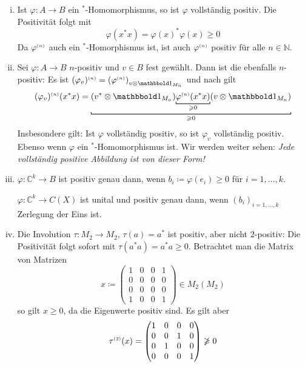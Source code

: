 \begin{beispiel}[label=bsp:35,{name=[{n-positive und vollständig positive Abbildungen}]}]
	\leavevmode
	\begin{enumerate}[(i)]
		\item Ist $\varphi \colon A \to B$ ein $^*$-Homomorphismus, so ist $\varphi$ vollständig positiv.
		Die Positivität folgt mit
		\[
			\varphi(x^*x) = \varphi(x)^* \varphi(x) \ge 0
		\]
		Da $\varphi^{\scriptscriptstyle(n)}$ auch ein $^*$-Homorphismus ist, ist auch $\varphi^{\scriptscriptstyle(n)}$ positiv für alle $n \in \mathbb{N}$.
		\item Sei $\varphi \colon A \to B$ $n$-positiv und $v \in B$ fest gewählt.
		Dann ist die 
		ebenfalls $n$-positiv:
		Es ist $(\varphi_v)^\ssbrace{n} = \enbrace*{\varphi^\ssbrace{n}}_{v \otimes \ind_{M_n}}$ und nach \cite[Satz~3.7 (v)]{OpAlg} gilt
		\[
			(\varphi_v)^\ssbrace{n}(x^* x) = \Underbracket{\enbrace*{v^* \otimes \ind_{M_n}} \Underbracket{\varphi^\ssbrace{n}(x^*x)}{\ge 0} \enbrace*{v \otimes \ind_{M_n}}}{\ge 0}
		\]
		Insbesondere gilt: Ist $\varphi$ vollständig positiv, so ist $\varphi_v$ vollständig positiv. Ebenso wenn $\varphi$ ein $^*$-Homomorphismus ist.
		Wir werden weiter sehen: \emph{Jede vollständig positive Abbildung ist von dieser Form!}
		\item $\varphi \colon \mathbb{C}^k \to B$ ist positiv genau dann, wenn $b_i \coloneqq \varphi(e_i) \ge 0$ für $i=1,\ldots ,k$.
		
		$\varphi \colon \mathbb{C}^k \to C(X)$ ist unital und positiv genau dann, wenn $(b_i)_{i=1,\ldots ,k}$ Zerlegung der Eins ist.
		\item Die Involution $\tau \colon M_2 \to M_2$, $\tau(a)=a^*$ ist positiv, aber nicht $2$-positiv:
		Die Positivität folgt sofort mit $\tau(a^*a)= a^*a \ge 0$. Betrachtet man die Matrix von Matrizen
		\[
			x \coloneqq \begin{pmatrix}
				1 & 0 & 0 & 1 \\
				0 & 0 & 0 & 0 \\
				0 & 0 & 0 & 0 \\
				1 & 0 & 0 & 1
			\end{pmatrix} \in M_2(M_2)
		\]
		so gilt $x \ge 0$, da die Eigenwerte positiv sind. Es gilt aber 
		\[
			\tau^{\scriptscriptstyle(2)}(x) = \begin{pmatrix}
				1 & 0 & 0 & 0 \\
				0 & 0 & 1 & 0 \\
				0 & 1 & 0 & 0 \\
				0 & 0 & 0 & 1
			\end{pmatrix} \not\geqslant 0
		\]
	\end{enumerate}
\end{beispiel}

